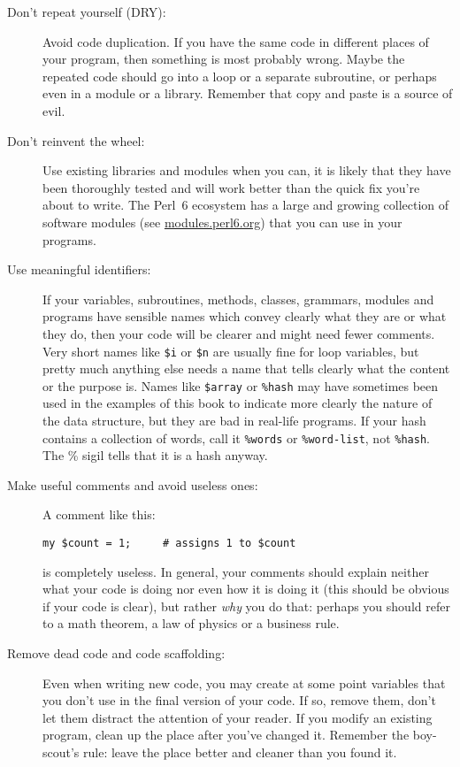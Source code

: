 \begin{description}

\item[Don't repeat yourself (DRY):] Avoid code duplication. 
If you have the same code in different places of your 
program, then something is most probably wrong. Maybe 
the repeated code should go into a loop or a separate 
subroutine, or perhaps even in a module or a library. 
Remember that copy and paste is a source of evil.

\item[Don't reinvent the wheel:] Use existing libraries 
and modules when you can, it is likely that they have 
been thoroughly tested and will work better than the 
quick fix you're about to write. The Perl~6 ecosystem 
has a large and growing collection of software modules 
(see \url{modules.perl6.org}) that you can use in your 
programs.

\item[Use meaningful identifiers:] If your variables, 
subroutines, methods, classes, grammars, modules 
and programs have sensible 
names which convey clearly what they are or what they do, 
then your code will be clearer and might need fewer 
comments. Very short names like \verb'$i' or \verb'$n' are 
usually fine for loop variables, but pretty much anything else needs 
a name that tells clearly what the content or the purpose is. 
Names like \verb'$array' or \verb'%hash' may have sometimes been 
used in the examples of this book to indicate more clearly 
the nature of the data structure, but they are bad in 
real-life programs. If your hash contains a collection of 
words, call it \verb'%words' or \verb'%word-list', not 
\verb'%hash'. The \% sigil tells that it is a hash anyway.

\item[Make useful comments and avoid useless ones:] A 
comment like this:
\begin{verbatim}
my $count = 1;     # assigns 1 to $count
\end{verbatim}
is completely useless. In general, your comments should 
explain neither what your code is doing nor even how it is doing 
it (this should be obvious if your code is clear), but 
rather \emph{why} you do that: perhaps you should refer 
to a math theorem, a law of physics or a business rule.

\item[Remove dead code and code scaffolding:] Even when 
writing new code, you may create at some point variables 
that you don't use in the final version of your code. If so, 
remove them, don't let them distract the attention of your 
reader. If you modify an existing program, clean up the place 
after you've changed it. Remember the boy-scout's rule: 
leave the place better and cleaner than you found it.


\end{description}
